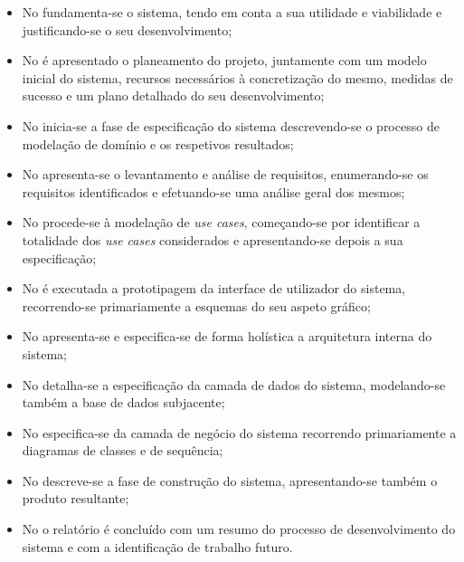 \begin{itemize}

  \item No  fundamenta-se o sistema, tendo em conta a sua utilidade e viabilidade e justificando-se o seu desenvolvimento;
  
  \item No  é apresentado o planeamento do projeto, juntamente com um modelo inicial do sistema, recursos necessários à concretização do mesmo, medidas de sucesso e um plano detalhado do seu desenvolvimento;
  
  \item No  inicia-se a fase de especificação do sistema descrevendo-se o processo de modelação de domínio e os respetivos resultados;
  
  \item No  apresenta-se o levantamento e análise de requisitos, enumerando-se os requisitos identificados e efetuando-se uma análise geral dos mesmos;
  
  \item No  procede-se à modelação de \emph{use cases}, começando-se por identificar a totalidade dos \emph{use cases} considerados e apresentando-se depois a sua especificação;
  
  \item No  é executada a prototipagem da interface de utilizador do sistema, recorrendo-se primariamente a esquemas do seu aspeto gráfico;
  
  \item No  apresenta-se e especifica-se de forma holística a arquitetura interna do sistema;
  
  \item No  detalha-se a especificação da camada de dados do sistema, modelando-se também a base de dados subjacente;
  
  \item No  especifica-se da camada de negócio do sistema recorrendo primariamente a diagramas de classes e de sequência;
  
  \item No  descreve-se a fase de construção do sistema, apresentando-se também o produto resultante;
  
  \item No  o relatório é concluído com um resumo do processo de desenvolvimento do sistema e com a identificação de trabalho futuro.

\end{itemize}

